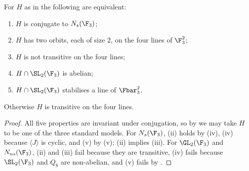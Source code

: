 \begin{corollary}\label{cor:groups:orbitdichotomy}
For $H$ as in  the following are equivalent:
\begin{enumerate}[label=(\roman*)]
\item $H$ is conjugate to $N_s(\F_3)$;
\item $H$ has two orbits, each of size $2$, on the four lines of $\F_3^2$;
\item $H$ is not transitive on the four lines;
\item $H\cap\SL_2(\F_3)$ is abelian;
\item $H\cap\SL_2(\F_3)$ stabilises a line of $\Fbar_3^2$.
\end{enumerate}
Otherwise $H$ is transitive on the four lines.
\end{corollary}

\begin{proof}
All five properties are invariant under conjugation, so by  we may take $H$ to be one of the three standard models. For $N_s(\F_3)$, (ii) holds
by (iv), (iv) because $\langle J\rangle$ is cyclic, and (v) by (v); (ii) implies (iii). For $\GL_2(\F_3)$ and $N_{ns}(\F_3)$, (ii) and (iii)
fail because they are transitive, (iv) fails because $\SL_2(\F_3)$ and $Q_8$ are non-abelian, and (v) fails by .
\end{proof}

